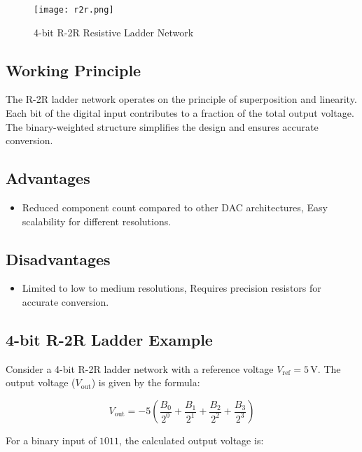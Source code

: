 \documentclass{article}
\begin{document}
\begin{figure}[h]
    \centering
    \texttt{[image: r2r.png]}
    \caption{4-bit R-2R Resistive Ladder Network}
    \label{fig:r2r}
\end{figure}
\subsection{Working Principle}

The R-2R ladder network operates on the principle of superposition and linearity. Each bit of the digital input contributes to a fraction of the total output voltage. The binary-weighted structure simplifies the design and ensures accurate conversion.

\subsection{Advantages}

\begin{itemize}
    \item Reduced component count compared to other DAC architectures, Easy scalability for different resolutions.
\end{itemize}

\subsection{Disadvantages}

\begin{itemize}
    \item Limited to low to medium resolutions, Requires precision resistors for accurate conversion.
\end{itemize}

\subsection{4-bit R-2R Ladder Example}

Consider a 4-bit R-2R ladder network with a reference voltage \(V_{\text{ref}} = 5 \, \text{V}\). The output voltage (\(V_{\text{out}}\)) is given by the formula:

{\fontsize{10}{6}\selectfont
\begin{equation}
    V_{\text{out}} = -5 \left( \frac{B_0}{2^0} + \frac{B_1}{2^1} + \frac{B_2}{2^2} + \frac{B_3}{2^3} \right)
\end{equation}
}

For a binary input of \(1011\), the calculated output voltage is:
\end{document}
